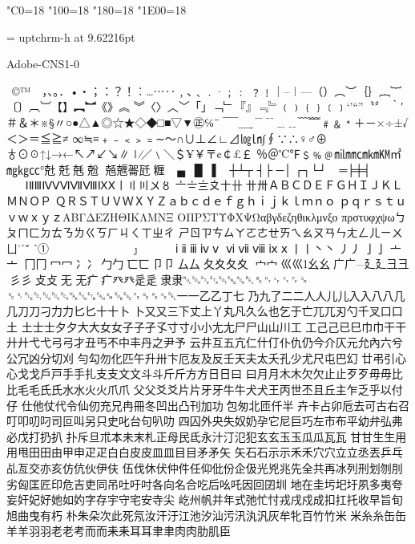%
%
%
%
\kcatcode"C0=18%
\kcatcode"100=18%
\kcatcode"180=18%
\kcatcode"1E00=18%

\font\uptchrm = uptchrm-h at 9.62216pt
\uptchrm


Adobe-CNS1-0

 ©™　，、。．•‧；：？！︰…⋯‥﹐､﹑﹒·﹔﹕
﹖﹗｜–︱—（）︵︶｛｝︷︸〔〕︹︺【】︻︼《》︽
︾〈〉︿﹀「」﹁﹂『』﹃﹄﹙﹚﹛﹜﹝﹞‘’“”〝〞
‵′＃＆＊※§〃○●△▲◎☆★◇◆□■▽▼㊣℅¯̄
‾￣＿ˍ﹉﹊﹍﹎﹋﹌﹟﹠﹡＋－×÷±√＜＞＝≦≧≠
∞≒≡﹢﹣﹤﹥﹦∼～∩∪⊥∠∟⊿㏒㏑∫∮∵∴♀♂⊕
♁⊙☉↑↓→←↖↗↙↘∥∣∕／﹨＼＄¥￥〒¢￠£￡
％＠℃℉﹩﹪﹫㏕㎜㎝㎞㏎㎡㎎㎏㏄°兙兛兞兝
兡兣嗧瓩糎▁▂▃▄▅▆▇█▏▎▍▌▋▊▉┼┴┬
┤├▔─│▕┌┐└┘╭╮╰╯═╞╪╡◢◣◥◤╱╲╳
０１２３４５６７８９ⅠⅡⅢⅣⅤⅥⅦⅧⅨⅩ〡〢〣〤〥
〦〧〨〩〸卄〹〺ＡＢＣＤＥＦＧＨＩＪＫＬＭＮＯＰ
ＱＲＳＴＵＶＷＸＹＺａｂｃｄｅｆｇｈｉｊｋｌｍｎｏ
ｐｑｒｓｔｕｖｗｘｙｚΑΒΓΔΕΖΗΘΙΚΛΜΝΞ
ΟΠΡΣΤΥΦΧΨΩαβγδεζηθικλμνξο
πρστυφχψωㄅㄆㄇㄈㄉㄊㄋㄌㄍㄎㄏㄐㄑㄒㄓㄔ
ㄕㄖㄗㄘㄙㄚㄛㄜㄝㄞㄟㄠㄡㄢㄣㄤㄥㄦㄧㄨㄩ˙ˊˇ̌
ˋ①②③④⑤⑥⑦⑧⑨⑩⑴⑵
⑶⑷⑸⑹⑺⑻⑼⑽ⅰⅱⅲⅳⅴ
ⅵⅶⅷⅸⅹ丨⼁丶⼂丿⼃⼅亅⼇亠
冂⼌冖⼍冫⼎⼓勹⼖匸⼙卩⼛厶⼡⼢夂夊
⼧宀⼮巛幺⼳广⼴廴⼵彐⼹彡⼺⽁攴⽆
无疒⽧癶⽨⾡辵⾪隶␀␁␂␃␄␅␆␇␈␉␊␋␌␍
␎␏␐␑␒␓␔␕␖␗␘␙␚␛␜␝␞␟␡⼀一⼄乙丁七
乃九了⼆二人⼈儿⼉入⼊八⼋⼏几⼑刀刁⼒力⼔匕十⼗卜
⼘⼜又三下丈上丫丸凡久么也乞于亡兀兀刃勺千叉⼝口土
⼟士⼠夕⼣大⼤女⼥⼦子孑孓寸⼨小⼩尢⼪尸⼫⼭山川工
⼯⼰己已巳巾⼱干⼲廾⼶弋⼷弓⼸才丑丐不中丰丹之尹予
云井互五亢仁什仃仆仇仍今介仄元允內六兮公冗凶分切刈
勻勾勿化匹午升卅卞厄友及反壬天夫太夭孔少尤尺屯巴幻
廿弔引心⼼戈⼽戶⼾手⼿扎⽀支文⽂斗⽃斤⽄方⽅日⽇曰
⽈月⽉木⽊欠⽋止⽌歹⽍毋⽏比⽐毛⽑氏⽒水⽔火⽕爪⽖
父⽗爻⽘片⽚牙⽛牛⽜犬⽝王丙世丕且丘主乍乏乎以付仔
仕他仗代令仙仞充兄冉冊冬凹出凸刊加功包匆北匝仟半
卉卡占卯卮去可古右召叮叩叨叼司叵叫另只史叱台句叭叻
四囚外央失奴奶孕它尼巨巧左市布平幼弁弘弗必戊打扔扒
扑斥旦朮本未末札正母民氐永汁汀氾犯玄⽞玉⽟瓜⽠瓦⽡
甘⽢生⽣⽤用甩⽥田由甲申⽦疋白⽩皮⽪皿⽫目⽬矛⽭矢
⽮石⽯示⽰禾⽲穴⽳立⽴丞丟乒乓乩亙交亦亥仿伉伙伊伕
伍伐休伏仲件任仰仳份企伋光兇兆先全共再冰列刑划刎刖
劣匈匡匠印危吉吏同吊吐吁吋各向名合吃后吆吒因回囝圳
地在圭圬圯圩夙多夷夸妄奸妃好她如妁字存宇守宅安寺尖
屹州帆并年式弛忙忖戎戌戍成扣扛托收早旨旬旭曲曳有朽
朴朱朵次此死氖汝汗汙江池汐汕污汛汍汎灰牟牝百竹⽵米
⽶糸⽷缶⽸羊⽺羽⽻老⽼考而⽽耒⽾耳⽿聿⾀肉⾁肋肌臣

